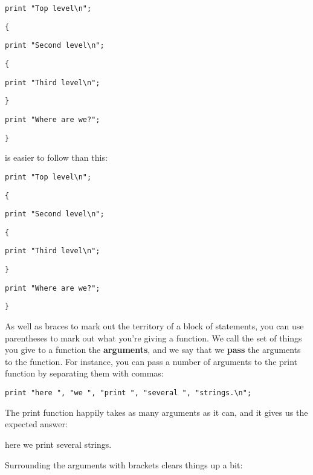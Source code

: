 \documentclass[a4paper,11pt]{book}
\begin{document}
\noindent 

\noindent \texttt{print "Top level\textbackslash n";}

\noindent \texttt{\{}

\noindent \texttt{print "Second level\textbackslash n";}

\noindent \texttt{\{}

\noindent \texttt{print "Third level\textbackslash n";}

\noindent \texttt{\}}

\noindent \texttt{print "Where are we?";}

\noindent \texttt{\}}

\noindent 

\noindent is easier to follow than this:

\noindent 

\noindent \texttt{print "Top level\textbackslash n";}

\noindent \texttt{\{}

\noindent \texttt{print "Second level\textbackslash n";}

\noindent \texttt{\{}

\noindent \texttt{print "Third level\textbackslash n";}

\noindent \texttt{\}}

\noindent \texttt{print "Where are we?";}

\noindent \texttt{\}}

\noindent 

\noindent As well as braces to mark out the territory of a block of statements, you can use parentheses to mark out what you're giving a function. We call the set of things you give to a function the \textbf{arguments}, and we say that we \textbf{pass }the arguments to the function. For instance, you can pass a number of arguments to the print function by separating them with commas:

\noindent 

\noindent \texttt{print "here ", "we ", "print ", "several ", "strings.\textbackslash n";}

\noindent 

\noindent The print function happily takes as many arguments as it can, and it gives us the expected answer:

\noindent 

\noindent here we print several strings.

\noindent 

\noindent Surrounding the arguments with brackets clears things up a bit:
\end{document}
